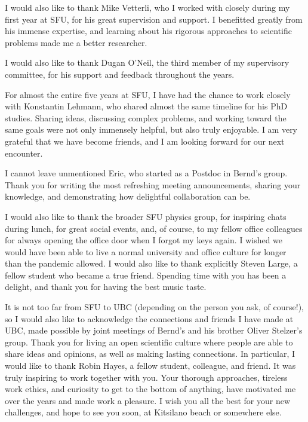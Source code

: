 I would also like to thank Mike Vetterli, who I worked with closely during my first year at SFU, for his great supervision and support.
I benefitted greatly from his immense expertise, and learning about his rigorous approaches to scientific problems made me a better researcher. 

I would also like to thank Dugan O'Neil, the third member of my supervisory committee, for his support and feedback throughout the years. 

For almost the entire five years at SFU, I have had the chance to work closely with Konstantin Lehmann, who shared almost the same timeline for his PhD studies. Sharing ideas, discussing complex problems, and working toward the same goals were not only immensely helpful, but also truly enjoyable. I am very grateful that we have become friends, and I am looking forward for our next encounter. 

I cannot leave unmentioned Eric, who started as a Postdoc in Bernd's group. Thank you for writing the most refreshing meeting announcements, sharing your knowledge, and demonstrating how delightful collaboration can be.

I would also like to thank the broader SFU physics group, for inspiring chats during lunch, for great social events, and, of course, to my fellow office colleagues for always opening the office door when I forgot my keys again. 
I wished we would have been able to live a normal university and office culture for longer than the pandemic allowed. 
I would also like to thank explicitly Steven Large, a fellow student who became a true friend. Spending time with you has been a delight, and thank you for having the best music taste. 

It is not too far from SFU to UBC (depending on the person you ask, of course!), so I would also like to acknowledge the connections and friends I have made at UBC, made possible by joint meetings of Bernd's and his brother Oliver Stelzer's group. 
Thank you for living an open scientific culture where people are able to share ideas and opinions, as well as making lasting connections. 
In particular, I would like to thank Robin Hayes, a fellow student, colleague, and friend. It was truly inspiring to work together with you. Your thorough approaches, tireless work ethics, and curiosity to get to the bottom of anything, have motivated me over the years and made work a pleasure. I wish you all the best for your new challenges, and hope to see you soon, at Kitsilano beach or somewhere else. 

